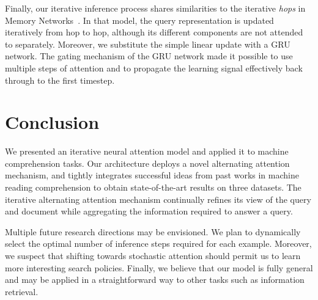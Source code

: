 \documentclass[11pt]{article}
\begin{document}
Finally, our iterative inference process shares similarities to the iterative \emph{hops} in Memory Networks~\cite{sukhbaatar2015end,hill2015goldilocks}. In that model, the query representation is updated iteratively from hop to hop, although its different components are not attended to separately. Moreover, we substitute the simple linear update with a GRU network. The gating mechanism of the GRU network made it possible to use multiple steps of attention and to propagate the learning signal effectively back through to the first timestep. 
\section{Conclusion}
We presented an iterative neural attention model and applied it to machine comprehension tasks. Our architecture deploys a novel alternating attention mechanism, and tightly integrates successful ideas from past works in machine reading comprehension to obtain state-of-the-art results on three datasets. The iterative alternating attention mechanism continually refines its view of the query and document while aggregating the information required to answer a query.

Multiple future research directions may be envisioned. We plan to dynamically select the optimal number of inference steps required for each example. Moreover, we suspect that shifting towards stochastic attention should permit us to learn more interesting search policies. Finally, we believe that our model is fully general and may be applied in a straightforward way to other tasks such as information retrieval.




\end{document}
